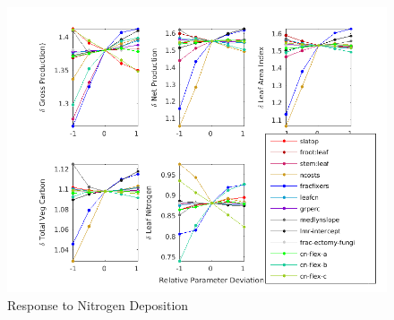 \documentclass[draft,linenumbers]{agujournal}
\begin{document}
  
 \begin{figure}[h]
     \centering
     \includegraphics[width=35pc]{matlab/figures/frac_deviation_CO2_response_1CLM5_1x1pt_Br-cax_ens_transient_ELEV_PI_y1.png}
     \caption{Response to Nitrogen Deposition}
     \label{Ndep}
  \end{figure}
  
  
\end{document}
